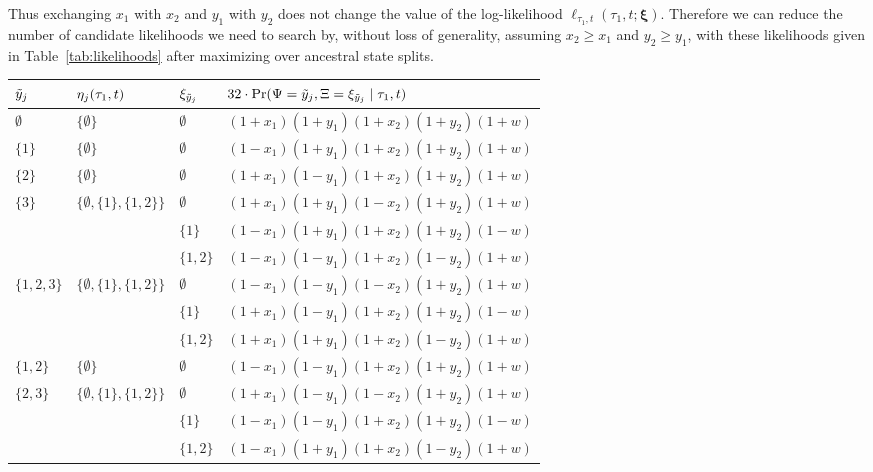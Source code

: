 Thus exchanging $x_1$ with $x_2$ and $y_1$ with $y_2$ does not change the value of the log-likelihood $\ell_{\tau_1,t}(\tau_1, t; \boldsymbol\xi)$.
Therefore we can reduce the number of candidate likelihoods we need to search by, without loss of generality, assuming $x_2 \ge x_1$ and $y_2 \ge y_1$, with these likelihoods given in Table~\ref{tab:likelihoods} after maximizing over ancestral state splits.

\begin{table}
\centering
\begin{tabular}{|lll|l|}
\hline
$\tilde{y}_j$ & $\eta_j(\tau_1, t)$ & $\xi_{\tilde{y}_j}$ & $32\cdot\Pr(\Psi=\tilde{y}_j,\Xi=\xi_{\tilde{y}_j} \mid \tau_1,t)$\\
\hline
$\emptyset$&$\{\emptyset\}$&$\emptyset$&$(1+x_1)(1+y_1)(1+x_2)(1+y_2)(1+w)$\\

$\{1\}$    &$\{\emptyset\}$&$\emptyset$&$(1-x_1)(1+y_1)(1+x_2)(1+y_2)(1+w)$\\

$\{2\}$    &$\{\emptyset\}$&$\emptyset$&$(1+x_1)(1-y_1)(1+x_2)(1+y_2)(1+w)$\\

$\{3\}$    &$\{\emptyset,\{1\},\{1,2\}\}$&$\emptyset$&$(1+x_1)(1+y_1)(1-x_2)(1+y_2)(1+w)$\\
&&$\{1\}$&$(1-x_1)(1+y_1)(1+x_2)(1+y_2)(1-w)$\\
&&$\{1,2\}$&$(1-x_1)(1-y_1)(1+x_2)(1-y_2)(1+w)$\\

$\{1,2,3\}$&$\{\emptyset,\{1\},\{1,2\}\}$&$\emptyset$&$(1-x_1)(1-y_1)(1-x_2)(1+y_2)(1+w)$\\
&&$\{1\}$&$(1+x_1)(1-y_1)(1+x_2)(1+y_2)(1-w)$\\
&&$\{1,2\}$&$(1+x_1)(1+y_1)(1+x_2)(1-y_2)(1+w)$\\

$\{1,2\}$  &$\{\emptyset\}$&$\emptyset$&$(1-x_1)(1-y_1)(1+x_2)(1+y_2)(1+w)$\\

$\{2,3\}$  &$\{\emptyset,\{1\},\{1,2\}\}$&$\emptyset$&$(1+x_1)(1-y_1)(1-x_2)(1+y_2)(1+w)$\\
&&$\{1\}$&$(1-x_1)(1-y_1)(1+x_2)(1+y_2)(1-w)$\\
&&$\{1,2\}$&$(1-x_1)(1+y_1)(1+x_2)(1-y_2)(1+w)$\\


\end{tabular}
\end{table}
